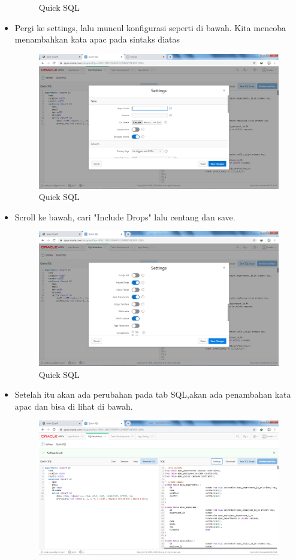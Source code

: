 \documentclass[12pt, times new roman]{article}
\begin{document}
\begin{itemize}
\begin{figure}[!htpb]
	\caption{Quick SQL}
\end{figure}
\item Pergi ke settings, lalu muncul konfigurasi seperti di bawah. Kita mencoba menambahkan kata apac pada sintaks diatas
\begin{figure}[!htpb]
	\centering
	\includegraphics[width=12.5cm]{figures/Screenshot_14.png}
	\caption{Quick SQL}
\end{figure}
\item Scroll ke bawah, cari "Include Drops" lalu centang dan save.
\begin{figure}[!htpb]
	\centering
	\includegraphics[width=12.5cm]{figures/Screenshot_15.png}
	\caption{Quick SQL}
\end{figure}
\item Setelah itu akan ada perubahan pada tab SQL,akan ada penambahan kata apac dan bisa di lihat di bawah.
\begin{figure}[!htpb]
	\centering
	\includegraphics[width=12.5cm]{figures/Screenshot_16.png}

\end{figure}
\end{itemize}
\end{document}
